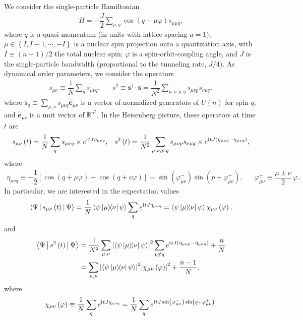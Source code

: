 \documentclass[nofootinbib,notitlepage,11pt]{revtex4-2}
\newcommand{\f}[2]{\dfrac{#1}{#2}} %
\newcommand{\p}[1]{\left(#1\right)} %
\renewcommand{\sp}[1]{\left[#1\right]} %
\renewcommand{\set}[1]{\left\{#1\right\}} %
\newcommand{\bk}{\Braket} %
\renewcommand{\v}{\bm} %
\newcommand{\uv}[1]{\bm{\hat{#1}}} %
\renewcommand{\i}{\mathrm{i}\mkern1mu} %
\newcommand{\1}{\mathds{1}}
\newcommand{\RR}{\mathbb{R}}
\begin{document}
We consider the single-particle Hamiltonian
\begin{align}
  H = -\f{J}{2} \sum_{\mu,q} \cos\p{q + \mu\varphi} s_{\mu\mu q},
\end{align}
where $q$ is a quasi-momentum (in units with lattice spacing $a=1$); $\mu\in\set{I,I-1,\cdots,-I}$ is a nuclear spin projection onto a quantization axis, with $I\equiv\p{n-1}/2$ the total nuclear spin; $\varphi$ is a spin-orbit-coupling angle, and $J$ is the single-particle bandwidth (proportional to the tunneling rate, $J/4$).
As dynamical order parameters, we consider the operators
\begin{align}
  s_{\mu\nu} \equiv \f1N \sum_q s_{\mu\nu q},
  &&
  s^2 \equiv \v s^\dag\cdot \v s
  = \f1{N^2} \sum_{\mu,\nu,p,q} s_{\mu\nu p} s_{\nu\mu q},
\end{align}
where $\v s_q\equiv\sum_{\mu,\nu} s_{\mu\nu q}\uv e_{\mu\nu}$ is a vector of normalized generators of $U(n)$ for spin $q$, and $\uv e_{\mu\nu}$ is a unit vector of $\RR^{n^2}$.
In the Heisenberg picture, these operators at time $t$ are
\begin{align}
  s_{\mu\nu}\p{t} = \f1N \sum_q s_{\mu\nu q}
  \times e^{\i t J \eta_{\mu\nu q}},
  &&
  s^2\p{t} = \f1{N^2} \sum_{\mu,\nu,p,q} s_{\mu\nu p} s_{\nu\mu q}
  \times e^{\i tJ\p{\eta_{\mu\nu p}-\eta_{\mu\nu q}}},
\end{align}
where
\begin{align}
  \eta_{\mu\nu q}
  \equiv -\f12 \sp{\cos\p{q+\mu\varphi} - \cos\p{q+\nu\varphi}}
  = \sin\p{\varphi_{\mu\nu}^-} \sin\p{p+\varphi_{\mu\nu}^+},
  &&
  \varphi_{\mu\nu}^\pm \equiv \f{\mu\pm\nu}{2}\,\varphi.
\end{align}
In particular, we are interested in the expectation values
\begin{align}
  \bk{\Psi|s_{\mu\nu}\p{t}|\Psi}
  = \f1N \bk{\psi\op{\mu}{\nu}\psi} \sum_q e^{\i t J \eta_{\mu\nu q}}
  = \bk{\psi\op{\mu}{\nu}\psi} \chi_{\mu\nu}\p{\varphi},
\end{align}
and
\begin{align}
  \bk{\Psi|s^2\p{t}|\Psi}
  &= \f1{N^2} \sum_{\mu,\nu} \abs{\bk{\psi\op{\mu}{\nu}\psi}}^2
  \sum_{p\ne q} e^{\i tJ\p{\eta_{\mu\nu p}-\eta_{\mu\nu q}}} + \f{n}{N} \\
  &= \sum_{\mu,\nu} \abs{\bk{\psi\op{\mu}{\nu}\psi}}^2
  \abs{\chi_{\mu\nu}\p{\varphi}}^2 + \f{n-1}{N},
\end{align}
where
\begin{align}
  \chi_{\mu\nu}\p{\varphi} \equiv \f1N \sum_q e^{\i tJ\eta_{\mu\nu q}}
  = \f1N \sum_q e^{\i tJ\sin\p{\varphi_{\mu\nu}^-} \sin\p{q+\varphi_{\mu\nu}^+}}.
\end{align}
\end{document}

